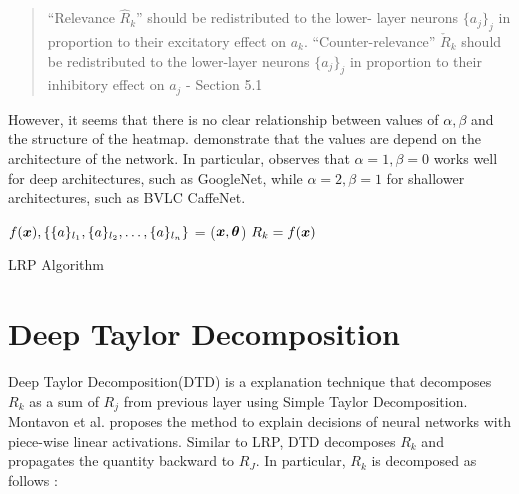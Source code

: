 \begin{quote}
``Relevance $\hat{R}_k$'' should be redistributed to the lower-
layer neurons $\{a_j\}_j$ in proportion to their excitatory effect on $a_k$. ``Counter-relevance'' $\check{R}_k $ should be redistributed to the lower-layer neurons $\{a_j\}_j$ in proportion to their inhibitory effect on $a_j$
	- Section 5.1 \cite{MontavonMethodsInterpretingUnderstanding2017}
\end{quote} 

However, it seems that there is no clear relationship between values of $\alpha,\beta$ and the structure of the heatmap. \cite{MontavonMethodsInterpretingUnderstanding2017, BinderLayerwiseRelevancePropagation2016} demonstrate that the values are depend on the architecture of the network. In particular, \cite{MontavonMethodsInterpretingUnderstanding2017} observes that $\alpha=1, \beta=0$ works well for deep architectures, such as GoogleNet\cite{SzegedyGoingDeeperConvolutions2014}, while  $\alpha=2, \beta=1$ for shallower architectures, such as BVLC CaffeNet\cite{JiaCaffeConvolutionalArchitecture2014}.



\begin{algorithm}[H]
$f(\patvector{x}), \{ \{a\}_{l_1}, \{a\}_{l_2}, \dots, \{a\}_{l_n}\}$ = ($\patvector{x}, \patvector{\theta}$)\;
$R_k = f(\patvector{x})$\;
 \caption{LRP Algorithm}
 \label{algo:lrp}
\end{algorithm}



\section{Deep Taylor Decomposition}
Deep Taylor Decomposition(DTD) is a explanation technique that decomposes $R_k$ as a sum of $R_j$ from previous layer using Simple Taylor Decomposition. Montavon et al.\cite{MontavonExplainingnonlinearclassification2017} proposes the method to explain decisions of neural networks with piece-wise linear activations. Similar to LRP, DTD decomposes $R_k$ and propagates the quantity backward to $R_J$. In particular, $R_k$ is decomposed as follows :


